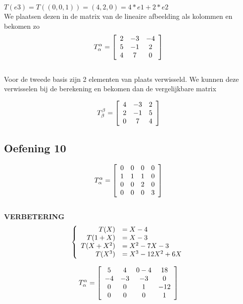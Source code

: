 \documentclass[lineaire_algebra_oplossingen.tex]{subfiles}
\begin{document}
$T(e3) = T( (0,0,1) ) = (4,2,0) = 4 * e1 + 2 * e2$\\

We plaatsen dezen in de matrix van de lineaire afbeelding als kolommen en bekomen zo\\

\[
T^{\alpha}_{\alpha} =
\left[
\begin{array}{c c c}
2 & -3 & -4\\
5 & -1 & 2\\
4 & 7 & 0
\end{array}
\right]
\]\\

Voor de tweede basis zijn 2 elementen van plaats verwisseld. We kunnen deze verwisselen bij de berekening en bekomen dan de vergelijkbare matrix

\[
T^{\beta}_{\beta} =
\left[
\begin{array}{c c c}
4 & -3 & 2\\
2 & -1 & 5\\
0 & 7 & 4
\end{array}
\right]
\]

\subsection{Oefening 10}

\[
T^{\alpha}_{\alpha} =
\left[
\begin{array}{c c c c}
0 & 0 & 0 & 0\\
1 & 1 & 1 & 0\\
0 & 0 & 2 & 0\\
0 & 0 & 0 & 3
\end{array}
\right]
\]\\

\textbf{VERBETERING}
\[
\left\lbrace
\begin{array}{r l}
T(X) &= X-4\\
T(1+X) &= X-3\\
T(X+X^2) &= X^2-7X-3\\
T(X^3) &= X^3-12X^2+6X\\
\end{array}
\right.
\]

\[
T^{\alpha}_{\alpha} =
\left[
\begin{array}{c c c c}
5 & 4 & 0-4 & 18\\
-4 & -3 & -3 & 0\\
0 & 0 & 1 & -12\\
0 & 0 & 0 & 1
\end{array}
\right]
\]\\
\end{document}
